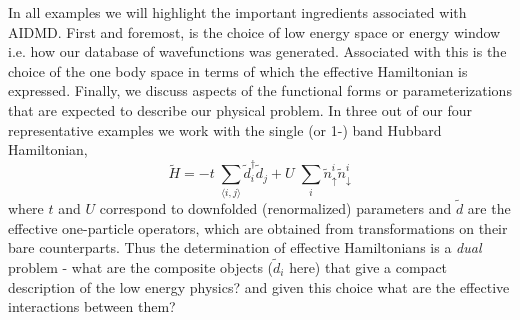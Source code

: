   
In all examples we will highlight the important ingredients associated with AIDMD. First and foremost, is the choice 
of low energy space or energy window i.e. how our database of wavefunctions was generated. Associated with this is 
the choice of the one body space in terms of which the effective Hamiltonian is expressed. Finally, we discuss 
aspects of the functional forms or parameterizations that are expected to describe our physical 
problem. In three out of our four representative examples we work with the single (or 1-) band Hubbard Hamiltonian,
\begin{equation}
	\tilde{H} = -t \;\sum_{\langle i,j \rangle} \tilde{d}_i^{\dagger} \tilde{d}_j + U \;\sum_{i} \tilde{n}^{i}_{\uparrow} \tilde{n}^{i}_{\downarrow}
\label{eq:oneband}
\end{equation}
where $t$ and $U$ correspond to downfolded (renormalized) parameters and $\tilde{d}$ are the effective one-particle operators, 
which are obtained from transformations on their bare counterparts. Thus 
the determination of effective Hamiltonians is a \emph{dual} problem - what are the composite objects ($\tilde{d}_i$ here) 
that give a compact description of the low energy physics? and given this choice what 
are the effective interactions between them?

